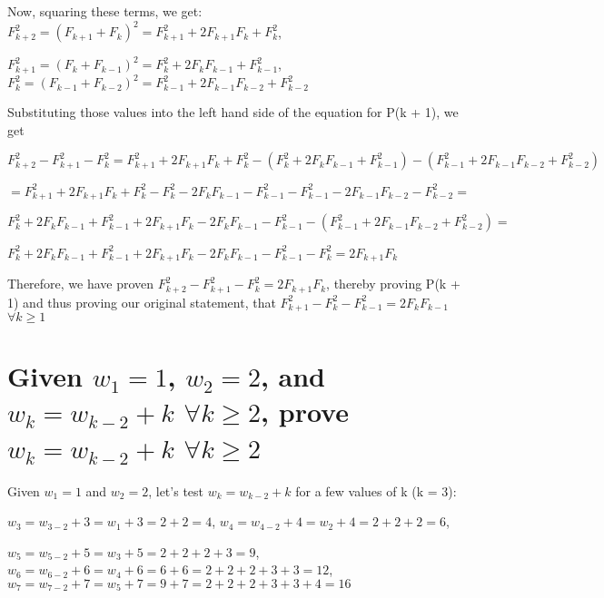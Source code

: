 \documentclass{article}
\begin{document}
\noindent Now, squaring these terms, we get: $F_{k + 2}^{2} = (F_{k + 1} + F_{k})^{2} = F_{k + 1}^{2} + 2F_{k + 1}F_{k} + F_{k}^2$,  \par\noindent
$F_{k + 1}^{2} = (F_{k} + F_{k - 1})^{2} = F_{k}^{2} + 2F_{k}F_{k - 1} + F_{k - 1}^{2}$, $F_{k}^{2} = (F_{k - 1} + F_{k - 2})^{2} = F_{k - 1}^{2} + 2F_{k - 1}F_{k - 2} + F_{k - 2}^{2}$ \par\vspace{0.5cm}

\noindent Substituting those values into the left hand side of the equation for P(k + 1), we get \par\noindent
$F_{k + 2}^{2} - F_{k + 1}^{2} - F_{k}^{2} = F_{k + 1}^{2} + 2F_{k + 1}F_{k} + F_{k}^2 - (F_{k}^{2} + 2F_{k}F_{k - 1} + F_{k - 1}^{2}) - (F_{k - 1}^{2} + 2F_{k - 1}F_{k - 2} + F_{k - 2}^{2})$ \par\noindent
$= F_{k + 1}^{2} + 2F_{k + 1}F_{k} + F_{k}^{2} - F_{k}^{2} - 2F_{k}F_{k - 1} - F_{k - 1}^{2} - F_{k - 1}^{2} - 2F_{k - 1}F_{k - 2} - F_{k - 2}^{2} = $\par\noindent
$F_{k}^{2} + 2F_{k}F_{k - 1} + F_{k - 1}^{2} + 2F_{k + 1}F_{k} - 2F_{k}F_{k - 1} - F_{k - 1}^{2} - (F_{k - 1}^{2} + 2F_{k - 1}F_{k - 2} + F_{k - 2}^{2}) = $ \par\noindent
$F_{k}^{2} + 2F_{k}F_{k - 1} + F_{k - 1}^{2} + 2F_{k + 1}F_{k} - 2F_{k}F_{k - 1} - F_{k - 1}^{2} - F_{k}^{2} = 2F_{k + 1}F_{k}$
\par\vspace{0.5cm}
\noindent Therefore, we have proven $F_{k + 2}^{2} - F_{k + 1}^{2} - F_{k}^{2} = 2F_{k + 1}F_{k}$, thereby proving P(k + 1) and thus proving our original statement, that $F_{k + 1}^{2} - F_{k}^{2} - F_{k - 1}^{2} = 2F_{k}F_{k - 1}$ $\forall k \geq 1$

\section{Given $w_{1} = 1$, $w_{2} = 2$, and $w_{k} = w_{k - 2} + k$ $\forall k \geq 2$, prove $w_{k} = w_{k - 2} + k$ $\forall k \geq 2$}

Given $w_{1} = 1$ and $w_{2} = 2$, let's test $w_{k} = w_{k - 2} + k$ for a few values of k (k = 3): \par\noindent
$w_{3} = w_{3 - 2} + 3 = w_{1} + 3 = 2 + 2 = 4$, $w_{4} = w_{4 - 2} + 4 = w_{2} + 4 = 2 + 2 + 2 = 6$, \par\noindent $w_{5} = w_{5 - 2} + 5 = w_{3} + 5 = 2 + 2 + 2 + 3 = 9$, $w_{6} = w_{6 - 2} + 6 = w_{4} + 6 = 6 + 6 = 2 + 2 + 2 + 3 + 3 = 12$, $w_{7} = w_{7 - 2} + 7 = w_{5} + 7 = 9 + 7 = 2 + 2 + 2 + 3 + 3 + 4 = 16$ \par\vspace{0.5cm}
\end{document}
